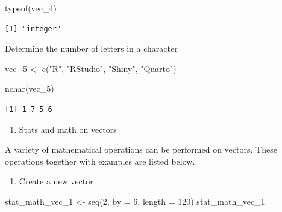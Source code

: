 \documentclass[
  letterpaper,
  DIV=11,
  numbers=noendperiod]{scrreprt}
\newenvironment{Shaded}{\begin{snugshade}}{\end{snugshade}}
\newcommand{\AttributeTok}[1]{\textcolor[rgb]{0.40,0.45,0.13}{#1}}
\newcommand{\DecValTok}[1]{\textcolor[rgb]{0.68,0.00,0.00}{#1}}
\newcommand{\FunctionTok}[1]{\textcolor[rgb]{0.28,0.35,0.67}{#1}}
\newcommand{\NormalTok}[1]{\textcolor[rgb]{0.00,0.23,0.31}{#1}}
\newcommand{\OtherTok}[1]{\textcolor[rgb]{0.00,0.23,0.31}{#1}}
\newcommand{\StringTok}[1]{\textcolor[rgb]{0.13,0.47,0.30}{#1}}
\providecommand{\tightlist}{%
  \setlength{\itemsep}{0pt}\setlength{\parskip}{0pt}}\usepackage{longtable,booktabs,array}
\begin{document}
\begin{Shaded}
\begin{Highlighting}[]
\FunctionTok{typeof}\NormalTok{(vec\_4)}
\end{Highlighting}
\end{Shaded}

\begin{verbatim}
[1] "integer"
\end{verbatim}

Determine the number of letters in a character

\begin{Shaded}
\begin{Highlighting}[]
\NormalTok{vec\_5 }\OtherTok{\textless{}{-}} \FunctionTok{c}\NormalTok{(}\StringTok{"R"}\NormalTok{, }\StringTok{"RStudio"}\NormalTok{, }\StringTok{"Shiny"}\NormalTok{, }\StringTok{"Quarto"}\NormalTok{)}
\end{Highlighting}
\end{Shaded}

\begin{Shaded}
\begin{Highlighting}[]
\FunctionTok{nchar}\NormalTok{(vec\_5)}
\end{Highlighting}
\end{Shaded}

\begin{verbatim}
[1] 1 7 5 6
\end{verbatim}

\begin{enumerate}
\def\labelenumi{\arabic{enumi}.}
\setcounter{enumi}{2}
\tightlist
\item
  Stats and math on vectors
\end{enumerate}

A variety of mathematical operations can be performed on vectors. These
operations together with examples are listed below.

\begin{enumerate}
\def\labelenumi{\alph{enumi}.}
\tightlist
\item
  Create a new vector
\end{enumerate}

\begin{Shaded}
\begin{Highlighting}[]
\NormalTok{stat\_math\_vec\_1 }\OtherTok{\textless{}{-}} \FunctionTok{seq}\NormalTok{(}\DecValTok{2}\NormalTok{, }\AttributeTok{by =} \DecValTok{6}\NormalTok{, }\AttributeTok{length =} \DecValTok{120}\NormalTok{)}
\NormalTok{stat\_math\_vec\_1}
\end{Highlighting}
\end{Shaded}
\end{document}
